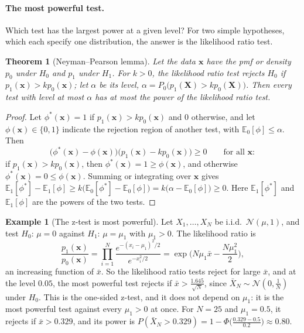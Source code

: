 \documentclass[11pt]{article}
\newcommand{\E}{\mathbb{E}}
\theoremstyle{definition}
\newtheorem{example}[definition]{Example}
\theoremstyle{plain}
\newtheorem{theorem}[definition]{Theorem}
\theoremstyle{remark}
\begin{document}
\paragraph{The most powerful test.} Which test has the largest power at a given level? For two simple hypotheses, which each specify one distribution, the answer is the likelihood ratio test.

\begin{theorem}[Neyman--Pearson lemma]\label{thm:neyman-pearson}
    Let the data $\mathbf{x}$ have the pmf or density $p_0$ under $H_0$ and $p_1$ under $H_1$. For $k > 0$, the likelihood ratio test rejects $H_0$ if $p_1(\mathbf{x}) > kp_0(\mathbf{x})$; let $\alpha$ be its level, $\alpha = P_0\big(p_1(\mathbf{X}) > kp_0(\mathbf{X})\big)$. Then every test with level at most $\alpha$ has at most the power of the likelihood ratio test.
\end{theorem}

\begin{proof}
    Let $\phi^*(\mathbf{x}) = 1$ if $p_1(\mathbf{x}) > kp_0(\mathbf{x})$ and $0$ otherwise, and let $\phi(\mathbf{x}) \in \{0, 1\}$ indicate the rejection region of another test, with $\E_0[\phi] \leq \alpha$. Then
    \[\big(\phi^*(\mathbf{x}) - \phi(\mathbf{x})\big)\big(p_1(\mathbf{x}) - kp_0(\mathbf{x})\big) \geq 0 \qquad \text{for all } \mathbf{x}:\]
    if $p_1(\mathbf{x}) > kp_0(\mathbf{x})$, then $\phi^*(\mathbf{x}) = 1 \geq \phi(\mathbf{x})$, and otherwise $\phi^*(\mathbf{x}) = 0 \leq \phi(\mathbf{x})$. Summing or integrating over $\mathbf{x}$ gives $\E_1[\phi^*] - \E_1[\phi] \geq k\big(\E_0[\phi^*] - \E_0[\phi]\big) = k\big(\alpha - \E_0[\phi]\big) \geq 0$. Here $\E_1[\phi^*]$ and $\E_1[\phi]$ are the powers of the two tests.
\end{proof}

\begin{example}[The z-test is most powerful]\label{ex:neyman-pearson}
    Let $X_1, \ldots, X_N$ be i.i.d.\ $\mathcal{N}(\mu, 1)$, and test $H_0$: $\mu = 0$ against $H_1$: $\mu = \mu_1$ with $\mu_1 > 0$. The likelihood ratio is
    \[\frac{p_1(\mathbf{x})}{p_0(\mathbf{x})} = \prod_{i=1}^N \frac{e^{-(x_i - \mu_1)^2/2}}{e^{-x_i^2/2}} = \exp\Big(N\mu_1\bar x - \frac{N\mu_1^2}{2}\Big),\]
    an increasing function of $\bar x$. So the likelihood ratio tests reject for large $\bar x$, and at the level $0.05$, the most powerful test rejects if $\bar x > \frac{1.645}{\sqrt{N}}$, since $\bar X_N \sim \mathcal{N}(0, \frac{1}{N})$ under $H_0$. This is the one-sided z-test, and it does not depend on $\mu_1$: it is the most powerful test against every $\mu_1 > 0$ at once. For $N = 25$ and $\mu_1 = 0.5$, it rejects if $\bar x > 0.329$, and its power is $P(\bar X_N > 0.329) = 1 - \Phi\big(\frac{0.329 - 0.5}{0.2}\big) \approx 0.80$.
\end{example}
\end{document}
